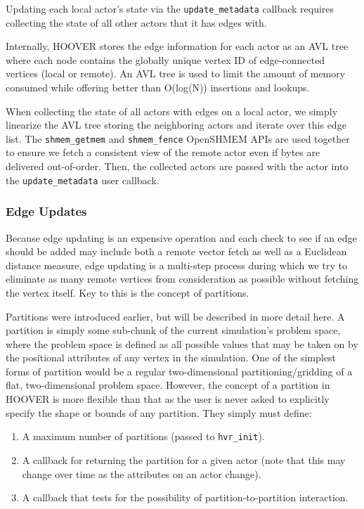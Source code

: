 Updating each local actor's state via the \texttt{update\_metadata} callback
requires collecting the state of all other actors that it has edges with.

Internally, HOOVER stores the edge information for each actor as an AVL tree
where each node contains the globally unique vertex ID of edge-connected
vertices (local or remote). An AVL tree is used to limit the amount of memory
consumed while offering better than O(log(N)) insertions and lookups.

When collecting the state of all actors with edges on a local actor, we simply
linearize the AVL tree storing the neighboring actors and iterate over this edge
list. The \texttt{shmem\_getmem} and \texttt{shmem\_fence} OpenSHMEM APIs are
used together to ensure we fetch a consistent view of the remote actor even if
bytes are delivered out-of-order. Then, the collected actors are passed with the
actor into the \texttt{update\_metadata} user callback.

\subsubsection{Edge Updates}
\label{sec:edge_updates}

Because edge updating is an expensive operation and each check to see if an edge
should be added may include both a remote vector fetch as well as a Euclidean
distance measure, edge updating is a multi-step process during which we try to
eliminate as many remote vertices from consideration as possible without
fetching the vertex itself. Key to this is the concept of partitions.

Partitions were introduced earlier, but will be described in more detail here. A
partition is simply some sub-chunk of the current simulation's problem space,
where the problem space is defined as all possible values that may be taken on
by the positional attributes of any vertex in the simulation. One of the simplest
forms of partition would be a regular two-dimensional partitioning/gridding of a
flat, two-dimensional problem space. However, the concept of a partition in HOOVER
is more flexible than that as the user is never asked to explicitly specify the
shape or bounds of any partition. They simply must define:

\begin{enumerate}
    \item A maximum number of partitions (passed to \texttt{hvr\_init}).
    \item A callback for returning the partition for a given actor (note that
        this may change over time as the attributes on an actor change).
    \item A callback that tests for the possibility of partition-to-partition interaction.
\end{enumerate}

